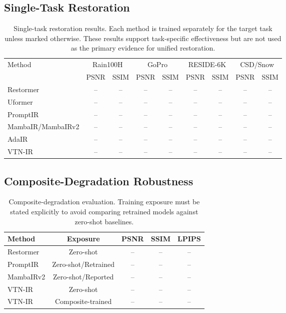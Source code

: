 \documentclass[10pt,twocolumn]{article}
\newcommand{\ours}{VTN-IR}
\begin{document}
\subsection{Single-Task Restoration}
\begin{table}[t]
\centering
\caption{Single-task restoration results. Each method is trained separately for the target task unless marked otherwise. These results support task-specific effectiveness but are not used as the primary evidence for unified restoration.}
\label{tab:single_task}
\small
\begin{tabular}{lcccccccc}
\toprule
\multirow{2}{*}{Method} & \multicolumn{2}{c}{Rain100H} & \multicolumn{2}{c}{GoPro} & \multicolumn{2}{c}{RESIDE-6K} & \multicolumn{2}{c}{CSD/Snow} \\
 & PSNR & SSIM & PSNR & SSIM & PSNR & SSIM & PSNR & SSIM \\
\midrule
Restormer & -- & -- & -- & -- & -- & -- & -- & -- \\
Uformer & -- & -- & -- & -- & -- & -- & -- & -- \\
PromptIR & -- & -- & -- & -- & -- & -- & -- & -- \\
MambaIR/MambaIRv2 & -- & -- & -- & -- & -- & -- & -- & -- \\
AdaIR & -- & -- & -- & -- & -- & -- & -- & -- \\
\ours & -- & -- & -- & -- & -- & -- & -- & -- \\
\bottomrule
\end{tabular}
\end{table}

\subsection{Composite-Degradation Robustness}
\begin{table}[t]
\centering
\caption{Composite-degradation evaluation. Training exposure must be stated explicitly to avoid comparing retrained models against zero-shot baselines.}
\label{tab:composite}
\small
\begin{tabular}{lcccc}
\toprule
Method & Exposure & PSNR & SSIM & LPIPS \\
\midrule
Restormer & Zero-shot & -- & -- & -- \\
PromptIR & Zero-shot/Retrained & -- & -- & -- \\
MambaIRv2 & Zero-shot/Reported & -- & -- & -- \\
\ours & Zero-shot & -- & -- & -- \\
\ours & Composite-trained & -- & -- & -- \\
\bottomrule
\end{tabular}
\end{table}
\end{document}
